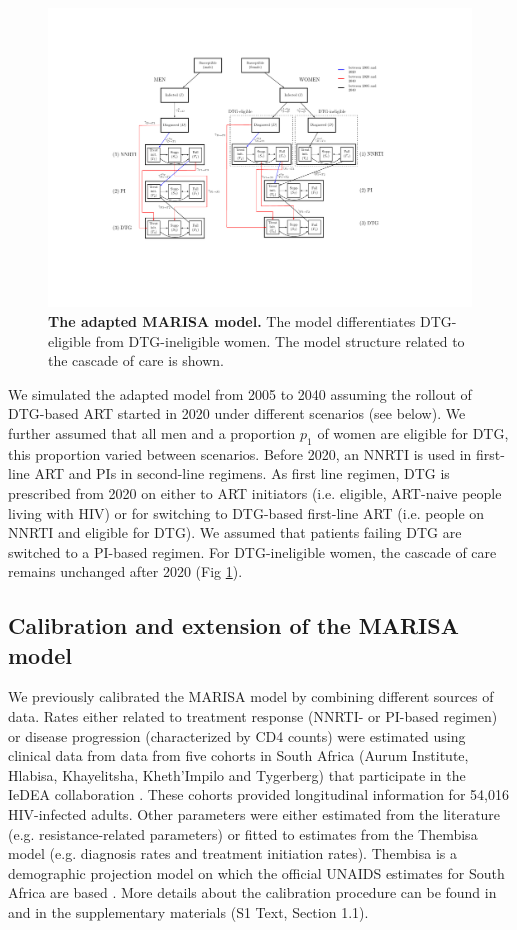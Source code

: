 \documentclass[10pt,letterpaper]{article}
\begin{document}
\begin{figure}[h]
   \includegraphics[width=14cm]{../figures/Fig1.pdf}
   \vspace{0.5cm}
   \caption{{\bf The adapted MARISA model.}
The model differentiates DTG-eligible from DTG-ineligible women. The model structure related to the cascade of care is shown.}\label{fig1}
\end{figure}

We simulated the adapted model from 2005 to 2040 assuming the rollout of DTG-based ART started in 2020 under different scenarios (see below). We further assumed that all men and a proportion $p_1$ of women are eligible for DTG, this proportion varied between scenarios. Before 2020, an NNRTI is used in first-line ART and PIs in second-line regimens. As first line regimen,  DTG is prescribed from 2020 on either to ART initiators (i.e. eligible, ART-naive people living with HIV) or for switching to DTG-based first-line ART (i.e. people on NNRTI and eligible for DTG). We assumed that patients failing DTG are switched to a PI-based regimen. For DTG-ineligible women, the cascade of care remains unchanged after 2020 (Fig \ref{fig1}).

\subsection*{Calibration and extension of the MARISA model}
We previously calibrated the MARISA model by combining different sources of data. Rates either related to treatment response (NNRTI- or PI-based regimen) or disease progression (characterized by CD4 counts) were estimated using clinical data from data from five cohorts in South Africa (Aurum Institute, Hlabisa, Khayelitsha, Kheth’Impilo and Tygerberg) that participate in the IeDEA collaboration  \cite{Egger2012}. These cohorts provided longitudinal information for 54,016 HIV-infected adults. Other parameters were either estimated from the literature (e.g. resistance-related parameters) or fitted to estimates from the Thembisa model (e.g. diagnosis rates and treatment initiation rates). Thembisa is a demographic projection model on which the official UNAIDS estimates for South Africa are based \cite{Johnson2017b}. More details about the calibration procedure can be found in \cite{Hauser2019} and in the supplementary materials (S1 Text, Section 1.1).
\end{document}
